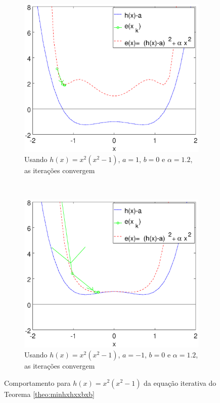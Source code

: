 \begin{figure}[!h]
    \centering
    \begin{subfigure}[b]{0.45\textwidth}
        \includegraphics[width=\textwidth]{chapters/minimization/mfiles/hx_a_alphax/minimizando_hx_a_alphax_1.eps}
        \caption{Usando $h(x)=x^2(x^2-1)$, $a=1$, $b=0$ e $\alpha=1.2$, as iterações convergem}
        \label{fig:hxbcasesa}
    \end{subfigure}
    ~ %
    \begin{subfigure}[b]{0.45\textwidth}
        \includegraphics[width=\textwidth]{chapters/minimization/mfiles/hx_a_alphax/minimizando_hx_a_alphax_2.eps}
        \caption{Usando $h(x)=x^2(x^2-1)$, $a=-1$, $b=0$ e $\alpha=1.2$, as iterações convergem}
        \label{fig:hxbcasesb}
    \end{subfigure}
    \caption{Comportamento para $h(x)=x^2(x^2-1)$ da equação iterativa do Teorema \ref{theo:minhxhxxbxb}}
    \label{fig:hxbcases}
\end{figure}



